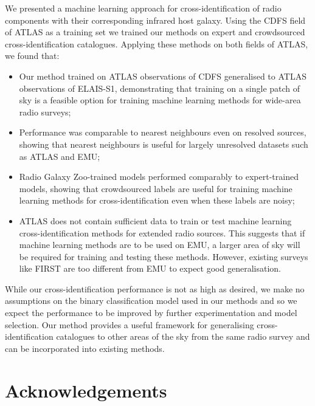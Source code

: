 \documentclass[fleqn,usenatbib,usedcolumn]{mnras}
\begin{document}
  We presented a machine learning approach for cross-identification of radio
  components with their corresponding infrared host galaxy. Using the CDFS field of ATLAS as a training set we trained our
  methods on expert and crowdsourced cross-identification catalogues. Applying these methods on both fields of ATLAS, we found that:
  \begin{itemize}
    \item Our method trained on ATLAS observations of CDFS generalised to ATLAS observations of ELAIS-S1, demonstrating that training on a single patch of sky is a feasible option for training machine learning methods for wide-area radio surveys;
    \item Performance was comparable to nearest neighbours even on resolved sources, showing that nearest neighbours is useful for largely unresolved datasets such as ATLAS and EMU;
    \item Radio Galaxy Zoo-trained models performed comparably to expert-trained models, showing that crowdsourced labels are useful for training machine learning methods for cross-identification even when these labels are noisy;
    \item ATLAS does not contain sufficient data to train or test machine learning cross-identification methods for extended radio sources. This suggests that if machine learning methods are to be used on EMU, a larger area of sky will be required for training and testing these methods. However, existing surveys like FIRST are too different from EMU to expect good generalisation.
  \end{itemize}

  While our cross-identification performance is not as high as desired, we
  make no assumptions on the binary classification model used in our methods
  and so we expect the performance to be improved by further experimentation
  and model selection. Our method provides a useful framework for generalising
  cross-identification catalogues to other areas of the sky from the same radio survey and can be
  incorporated into existing methods.

\section{Acknowledgements}
\end{document}
